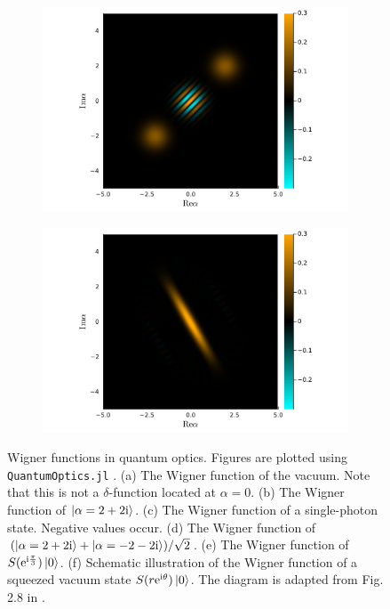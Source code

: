 \documentclass[hyperref, a4paper]{article}
\newcommand*{\ii}{\mathrm{i}}
\newcommand*{\ee}{\mathrm{e}}
\begin{document}
\begin{figure}
\begin{subfigure}{0.45\textwidth}
        \subcaption{}
    \end{subfigure}
    \begin{subfigure}{0.45\textwidth}
        \centering
        \includegraphics[width=\textwidth]{heatmaps/coherent-state-composition.pdf}
        \subcaption{} 
    \end{subfigure}
    \begin{subfigure}{0.45\textwidth}
        \centering
        \includegraphics[width=\textwidth]{heatmaps/squeezed-state.pdf}
        \subcaption{}
    \end{subfigure}
    \begin{subfigure}{0.45\textwidth}
        
        \subcaption{}
    \end{subfigure}
    \caption{Wigner functions in quantum optics. 
    Figures are plotted using \texttt{QuantumOptics.jl} \cite{kramer2018quantumoptics}.
    (a) The Wigner function of the vacuum. Note that this is not a $\delta$-function located at $\alpha = 0$.
    (b) The Wigner function of $\ket{\alpha = 2 + 2\ii}$.
    (c) The Wigner function of a single-photon state. Negative values occur.
    (d) The Wigner function of $(\ket{\alpha = 2 + 2 \ii} + \ket{\alpha = - 2 - 2 \ii}) / \sqrt{2}$.
    (e) The Wigner function of $S(\ee^{\ii \frac{\pi}{3}}) \ket{0}$.
    (f) Schematic illustration of the Wigner function of a squeezed vacuum state
    $S(r\ee^{\ii \theta}) \ket{0}$.
    The diagram is adapted from Fig. 2.8 in \cite{scully1999quantum}.
    }
    \label{fig:wigner-example}
\end{figure}
\end{document}

